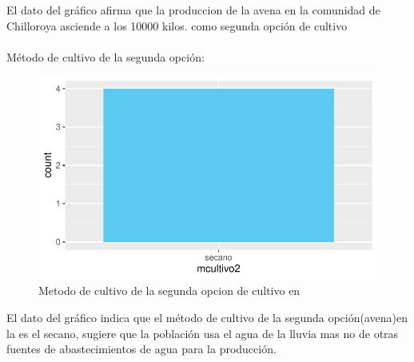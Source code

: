 \documentclass[12pt]{article}\usepackage[]{graphicx}\usepackage[]{xcolor}
\makeatletter
\def\maxwidth{ %
  \ifdim\Gin@nat@width>\linewidth
    \linewidth
  \else
    \Gin@nat@width
  \fi
}
\newenvironment{knitrout}{}{} %
\makeatother
\begin{document}
	El dato del gráfico afirma que la produccion de la avena en la comunidad de Chilloroya asciende a los 10000 kilos. como segunda opción de cultivo\\
	\\
	Método de cultivo de la segunda opción:
	\begin{figure}[H]
	\centering
\begin{knitrout}
\color{fgcolor}
\includegraphics[width=\maxwidth]{figure/eleven-1} 
\end{knitrout}
	\caption{Metodo de cultivo de la segunda opcion de cultivo en \comunidad}
	\end{figure}
	El dato del gráfico indica que el método de cultivo de la segunda opción(avena)en la \comunidad es el secano, sugiere que la población usa el agua de la lluvia mas no de otras fuentes de abastecimientos de agua para la producción.\\
	\\
	
\end{document}
